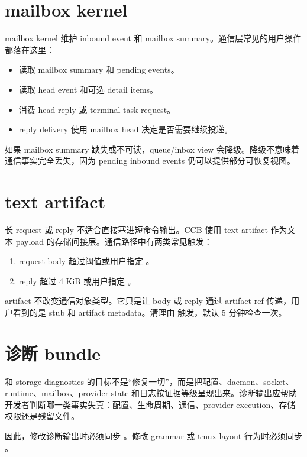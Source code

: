 \section{mailbox kernel}

mailbox kernel 维护 inbound event 和 mailbox summary。通信层常见的用户操作都落在这里：

\begin{itemize}
  \item {} 读取 mailbox summary 和 pending events。
  \item {} 读取 head event 和可选 detail items。
  \item {} 消费 head reply 或 terminal task request。
  \item reply delivery 使用 mailbox head 决定是否需要继续投递。
\end{itemize}

如果 mailbox summary 缺失或不可读，queue/inbox view 会降级。降级不意味着通信事实完全丢失，因为 pending inbound events 仍可以提供部分可恢复视图。

\section{text artifact}

长 request 或 reply 不适合直接塞进短命令输出。CCB 使用 text artifact 作为文本 payload 的存储间接层。通信路径中有两类常见触发：

\begin{enumerate}
  \item request body 超过阈值或用户指定 。
  \item reply 超过 4 KiB 或用户指定 。
\end{enumerate}

artifact 不改变通信对象类型。它只是让 body 或 reply 通过 artifact ref 传递，用户看到的是 stub 和 artifact metadata。清理由  触发，默认 5 分钟检查一次。

\section{诊断 bundle}

 和 storage diagnostics 的目标不是“修复一切”，而是把配置、daemon、socket、runtime、mailbox、provider state 和日志按证据等级呈现出来。诊断输出应帮助开发者判断哪一类事实失真：配置、生命周期、通信、provider execution、存储权限还是残留文件。

因此，修改诊断输出时必须同步 。修改  grammar 或 tmux layout 行为时必须同步 。
